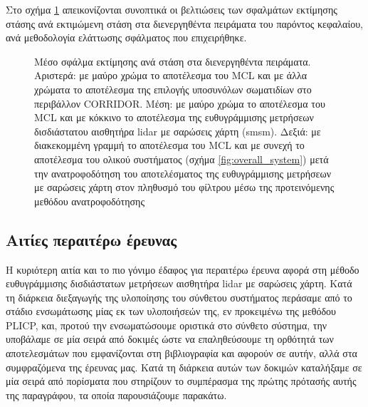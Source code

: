 Στο σχήμα \ref{fig:02_02_05:01} απεικονίζονται συνοπτικά οι βελτιώσεις των
σφαλμάτων εκτίμησης στάσης ανά εκτιμώμενη στάση στα διενεργηθέντα πειράματα
του παρόντος κεφαλαίου, ανά μεθοδολογία ελάττωσης σφάλματος που επιχειρήθηκε.

\begin{figure}[h]
  \vspace{1.5cm}
  \hspace{-1.5cm}
  
  \vspace{1cm}
  \caption{\small Μέσο σφάλμα εκτίμησης ανά στάση στα διενεργηθέντα πειράματα.
           Αριστερά: με μαύρο χρώμα το αποτέλεσμα του MCL και με άλλα χρώματα
           το αποτέλεσμα της επιλογής υποσυνόλων σωματιδίων στο περιβάλλον
           CORRIDOR. Μέση: με μαύρο χρώμα το αποτέλεσμα του MCL και με κόκκινο
           το αποτέλεσμα της ευθυγράμμισης μετρήσεων δισδιάστατου αισθητήρα
           lidar με σαρώσεις χάρτη (smsm). Δεξιά: με διακεκομμένη γραμμή το
           αποτέλεσμα του MCL και με συνεχή το αποτέλεσμα του ολικού συστήματος
           (σχήμα \ref{fig:overall_system}) μετά την ανατροφοδότηση του
           αποτελέσματος της ευθυγράμμισης μετρήσεων με σαρώσεις χάρτη στον
           πληθυσμό του φίλτρου μέσω της προτεινόμενης μεθόδου ανατροφοδότησης}
  \label{fig:02_02_05:01}
\end{figure}


\subsection{Αιτίες περαιτέρω έρευνας}
\label{subsection:02_02_05:02}

Η κυριότερη αιτία και το πιο γόνιμο έδαφος για περαιτέρω έρευνα αφορά στη
μέθοδο ευθυγράμμισης δισδιάστατων μετρήσεων αισθητήρα lidar με σαρώσεις χάρτη.
Κατά τη διάρκεια διεξαγωγής της υλοποίησης του σύνθετου συστήματος περάσαμε από
το στάδιο ενσωμάτωσης μίας εκ των υλοποιήσεών της, εν προκειμένω της μεθόδου
PLICP, και, προτού την ενσωματώσουμε οριστικά στο σύνθετο σύστημα, την
υποβάλαμε σε μία σειρά από δοκιμές ώστε να επαληθεύσουμε τη ορθότητά των
αποτελεσμάτων που εμφανίζονται στη βιβλιογραφία και αφορούν σε αυτήν, αλλά στα
συμφραζόμενα της έρευνας μας.  Κατά τη διάρκεια αυτών των δοκιμών καταλήξαμε σε
μία σειρά από πορίσματα που στηρίζουν το συμπέρασμα της πρώτης πρότασής αυτής
της παραγράφου, τα οποία παρουσιάζουμε παρακάτω.


